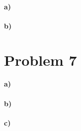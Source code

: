 \documentclass[12pt]{article}
\begin{document}
\paragraph{a)}

\paragraph{b)}

\section*{Problem 7}

\paragraph{a)}

\paragraph{b)}

\paragraph{c)}
\end{document}
